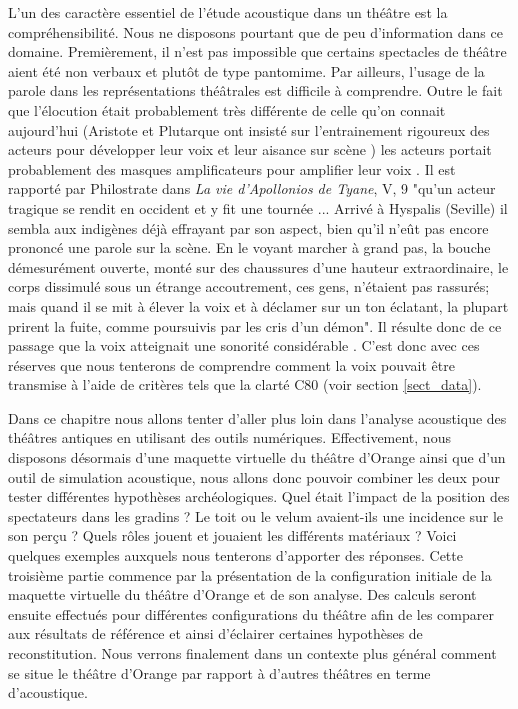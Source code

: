 L'un des caractère essentiel de l'étude acoustique dans un théâtre est la compréhensibilité. Nous ne disposons pourtant que de peu d'information dans ce domaine. Premièrement, il n'est pas impossible que certains spectacles de théâtre aient été non verbaux et plutôt de type pantomime. Par ailleurs, l'usage de la parole dans les représentations théâtrales est difficile à comprendre. Outre le fait que l'élocution était probablement très différente de celle qu'on connait aujourd'hui (Aristote \cite[Chap IV - XIV]{aristote} et Plutarque ont insisté sur l'entrainement rigoureux des acteurs pour développer leur voix et leur aisance sur scène \cite[p.39]{canac}) les acteurs portait probablement des masques amplificateurs pour amplifier leur voix \cite[p.362]{arnaud}. Il est rapporté par Philostrate dans \textit{La vie d'Apollonios de Tyane}, V, 9 "qu'un acteur tragique se rendit en occident et y fit une tournée ... Arrivé à Hyspalis (Seville) il sembla aux indigènes déjà effrayant par son aspect, bien qu'il n'eût pas encore prononcé une parole sur la scène. En le voyant marcher à grand pas, la bouche démesurément ouverte, monté sur des chaussures d'une hauteur extraordinaire, le corps dissimulé sous un étrange accoutrement, ces gens, n'étaient pas rassurés; mais quand il se mit à élever la voix et à déclamer sur un ton éclatant, la plupart prirent la fuite, comme poursuivis par les cris d'un démon". Il résulte donc de ce passage que la voix atteignait une sonorité considérable \cite[p.43]{formige}. C'est donc avec ces réserves que nous tenterons de comprendre comment la voix pouvait être transmise à l'aide de critères tels que la clarté \gls{C80} (voir section \ref{sect_data}).

Dans ce chapitre nous allons tenter d'aller plus loin dans l'analyse acoustique des théâtres antiques en utilisant des outils numériques. Effectivement, nous disposons désormais d'une maquette virtuelle du théâtre d'Orange ainsi que d'un outil de simulation acoustique, nous allons donc pouvoir combiner les deux pour tester différentes hypothèses archéologiques. Quel était l'impact de la position des spectateurs dans les gradins ? Le toit ou le \gls{velum} avaient-ils une incidence sur le son perçu ? Quels rôles jouent et jouaient les différents matériaux ? Voici quelques exemples auxquels nous tenterons d'apporter des réponses. Cette troisième partie commence par la présentation de la configuration initiale de la maquette virtuelle du théâtre d'Orange et de son analyse. Des calculs seront ensuite effectués pour différentes configurations du théâtre afin de les comparer aux résultats de référence et ainsi d'éclairer certaines hypothèses de reconstitution. Nous verrons finalement dans un contexte plus général comment se situe le théâtre d'Orange par rapport à d'autres théâtres en terme d'acoustique.	
	

